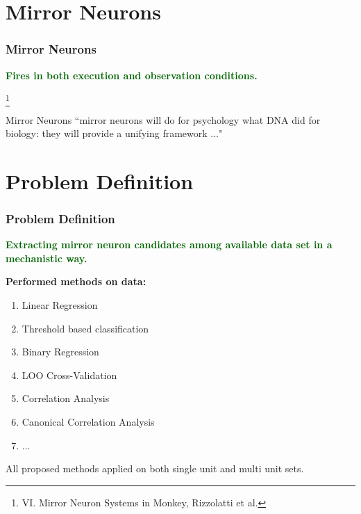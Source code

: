 \documentclass{beamer}
\begin{document}
\section{ Mirror Neurons }

\begin{frame}
\frametitle{ Mirror Neurons}


\centering \textcolor{darkgreen}{\textbf{Fires in both execution and observation conditions.}}
\centering
{}

\footnote{\tiny  VI. Mirror Neuron Systems in Monkey, Rizzolatti et al.}

\begin{block}{Mirror Neurons}
``mirror neurons will do for psychology what DNA did for biology: they will provide a unifying framework ..."
\end{block}

\end{frame}
\section{ Problem Definition }
\begin{frame}
\frametitle{Problem Definition}

\begin{center}
\textcolor{darkgreen}{\textbf{Extracting mirror neuron candidates among
available data set in a mechanistic way.}}
\end{center}

\textbf{Performed methods on data:}
\begin{enumerate}
\item Linear Regression
\item Threshold based classification
\item Binary Regression
\item LOO Cross-Validation
\item Correlation Analysis
\item Canonical Correlation Analysis
\item ...

\end{enumerate}

All proposed methods applied on both single unit and multi unit sets.




\end{frame}
\end{document}
